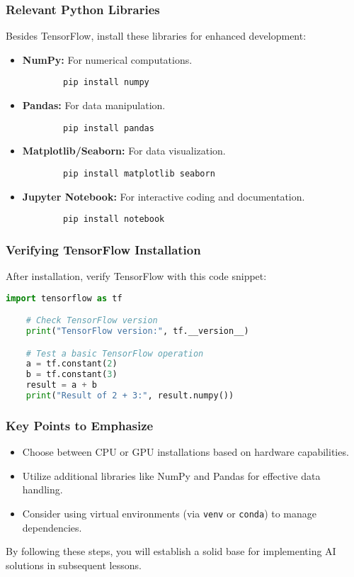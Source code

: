 \documentclass[aspectratio=169]{beamer}
\begin{document}
\begin{frame}[fragile]
    \frametitle{Relevant Python Libraries}
    Besides TensorFlow, install these libraries for enhanced development:

    \begin{itemize}
        \item \textbf{NumPy:} For numerical computations.
        \begin{lstlisting}
        pip install numpy
        \end{lstlisting}

        \item \textbf{Pandas:} For data manipulation.
        \begin{lstlisting}
        pip install pandas
        \end{lstlisting}

        \item \textbf{Matplotlib/Seaborn:} For data visualization.
        \begin{lstlisting}
        pip install matplotlib seaborn
        \end{lstlisting}

        \item \textbf{Jupyter Notebook:} For interactive coding and documentation.
        \begin{lstlisting}
        pip install notebook
        \end{lstlisting}
    \end{itemize}
\end{frame}

\begin{frame}[fragile]
    \frametitle{Verifying TensorFlow Installation}
    After installation, verify TensorFlow with this code snippet:

    \begin{lstlisting}[language=Python]
    import tensorflow as tf

    # Check TensorFlow version
    print("TensorFlow version:", tf.__version__)

    # Test a basic TensorFlow operation
    a = tf.constant(2)
    b = tf.constant(3)
    result = a + b
    print("Result of 2 + 3:", result.numpy())
    \end{lstlisting}
\end{frame}

\begin{frame}[fragile]
    \frametitle{Key Points to Emphasize}
    \begin{itemize}
        \item Choose between CPU or GPU installations based on hardware capabilities.
        \item Utilize additional libraries like NumPy and Pandas for effective data handling.
        \item Consider using virtual environments (via \texttt{venv} or \texttt{conda}) to manage dependencies.
    \end{itemize}
    By following these steps, you will establish a solid base for implementing AI solutions in subsequent lessons.
\end{frame}
\end{document}
